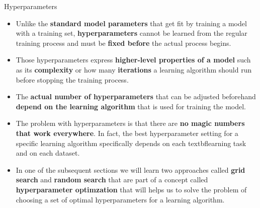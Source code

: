 \documentclass[main.tex]{subfiles}
\begin{document}
    \begin{frame}{Hyperparameters}
        \begin{itemize}
            \item Unlike the \textbf{standard model parameters} that get fit by training a model with a training set, \textbf{hyperparameters} cannot be learned from the regular training process and must be \textbf{fixed before} the actual process begins.
            \item Those hyperparameters express \textbf{higher-level properties of a model} such as its \textbf{complexity} or how many \textbf{iterations} a learning algorithm should run before stopping the training process. 
            \item The \textbf{actual number of hyperparameters} that can be adjusted beforehand \textbf{depend on the learning algorithm} that is used for training the model.
            \item The problem with hyperparameters is that there are \textbf{no magic numbers that work everywhere}. In fact, the best hyperparameter setting for a specific learning algorithm specifically depends on each textbf{learning task and on each dataset}.
            \item In one of the subsequent sections we will learn two approaches called \textbf{grid search} and \textbf{random search} that are part of a concept called \textbf{hyperparameter optimzation} that will helps us to solve the problem of choosing a set of optimal hyperparameters for a learning algorithm.
        \end{itemize}
    \end{frame}
\end{document}
